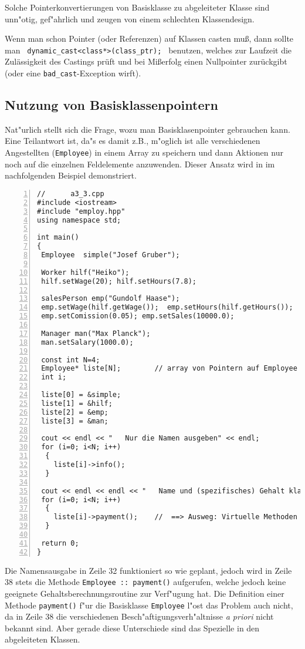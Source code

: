 Solche Pointerkonvertierungen von Basisklasse zu abgeleiteter Klasse
sind unn"otig, gef"ahrlich und zeugen von einem schlechten Klassendesign.

Wenn man schon Pointer (oder Referenzen) auf Klassen casten muß, dann sollte man 
\verb| dynamic_cast<class*>(class_ptr); |  benutzen, 
welches zur Laufzeit die Zulässigkeit des Castings prüft und bei Mißerfolg einen 
Nullpointer zurückgibt (oder eine \texttt{bad\_cast}-Exception wirft).
%
%
\subsection{Nutzung von Basisklassenpointern}
\label{sec:A4.3}
%
Nat"urlich stellt sich die Frage, wozu man Basisklasenpointer gebrauchen kann.
Eine Teilantwort ist, da"s es damit z.B., m"oglich ist alle verschiedenen
Angestellten (\texttt{Employee}) in einem Array zu speichern und
dann Aktionen nur noch auf die einzelnen Feldelemente anzuwenden.
Dieser Ansatz wird in im nachfolgenden Beispiel
demonstriert.
\begin{lstlisting}[caption={Nutzung von Klassenpointern.},label=lst:casting_klassen_3,
basicstyle=\scriptsize,numbers=left, numberstyle=\tiny, stepnumber=2, numbersep=5pt]
//		a3_3.cpp
#include <iostream>
#include "employ.hpp"
using namespace std;

int main()
{
 Employee  simple("Josef Gruber");

 Worker hilf("Heiko");
 hilf.setWage(20); hilf.setHours(7.8);

 salesPerson emp("Gundolf Haase");
 emp.setWage(hilf.getWage());  emp.setHours(hilf.getHours());
 emp.setComission(0.05); emp.setSales(10000.0);

 Manager man("Max Planck");
 man.setSalary(1000.0);

 const int N=4;
 Employee* liste[N];		// array von Pointern auf Employee
 int i;

 liste[0] = &simple;
 liste[1] = &hilf;
 liste[2] = &emp;
 liste[3] = &man;

 cout << endl << "   Nur die Namen ausgeben" << endl;
 for (i=0; i<N; i++)
  {
    liste[i]->info();
  }

 cout << endl << endl << "   Name und (spezifisches) Gehalt klappen nicht" << endl;
 for (i=0; i<N; i++)
  {
    liste[i]->payment();	//	==> Ausweg: Virtuelle Methoden
  }

 return 0;
}
\end{lstlisting}
Die Namensausgabe in Zeile 32 funktioniert so wie geplant, jedoch
wird in Zeile 38 stets die Methode
\verb|Employee :: payment()| aufgerufen, welche jedoch keine
geeignete Gehaltsberechnungsroutine zur Verf"ugung hat.
Die Definition einer Methode \texttt{payment()} f"ur die Basisklasse
\texttt{Employee} l"ost das Problem auch nicht,
da in Zeile 38 die verschiedenen Besch"aftigungsverh"altnisse
\emph{a priori} nicht bekannt sind.
Aber gerade diese Unterschiede sind das Spezielle in den abgeleiteten Klassen.

